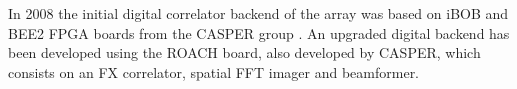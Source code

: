 \documentclass[useAMS,macros,usenatbib]{mn2e}
\begin{document}
In 2008 the initial digital correlator backend of the array was based on iBOB and BEE2 FPGA boards from the CASPER group \citep{best2-casper}.
An upgraded digital backend has been developed using the ROACH board, also developed by CASPER, which consists on an FX correlator, spatial FFT imager and beamformer.
\end{document}
